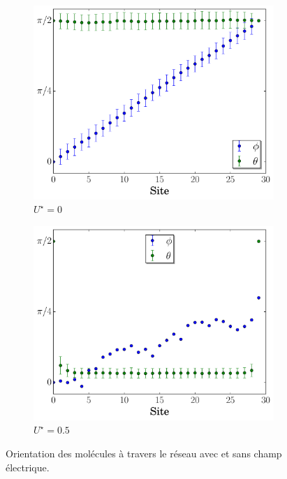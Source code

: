 \documentclass[11pt]{article}
\numberwithin{equation}{section}
\begin{document}
\begin{figure}[h!]
\center
    \begin{subfigure}[b]{0.49\textwidth}
    \centering	    
	\includegraphics[scale=0.43]{figures/lcd_allume_T01.pdf}
    \caption{$U^\star = 0$}
    	\label{lcd_allume} 
    \end{subfigure}	
	\begin{subfigure}[b]{0.49\textwidth}
    \centering	    
	\includegraphics[scale=0.43]{figures/lcd_etteind.pdf}
    \caption{$U^\star = 0.5$}
    	\label{lcd_etteint} 
    \end{subfigure}

    \caption{Orientation des molécules à travers le réseau avec et sans champ électrique.}
    \label{lcd}
\end{figure}
\end{document}
